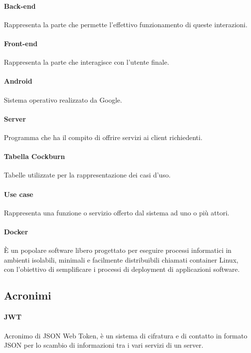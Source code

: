\paragraph{Back-end} Rappresenta la parte che permette l'effettivo funzionamento di queste interazioni.

\paragraph{Front-end} Rappresenta la parte che interagisce con l'utente finale.

\paragraph{Android} Sistema operativo realizzato da Google.

\paragraph{Server}  Programma che ha il compito di offrire servizi ai client richiedenti.

\paragraph{Tabella Cockburn} Tabelle utilizzate per la rappresentazione dei casi d'uso.

\paragraph{Use case} Rappresenta una funzione o servizio offerto dal sistema ad uno o più attori.

\paragraph{Docker} \`{E} un popolare software libero progettato per eseguire processi informatici in ambienti isolabili, minimali e facilmente distribuibili chiamati container Linux, con l'obiettivo di semplificare i processi di deployment di applicazioni software.
\newpage
\subsection{Acronimi}
\paragraph{JWT} Acronimo di JSON Web Token, è un sistema di cifratura e di contatto in formato JSON per lo scambio di informazioni tra i vari servizi di un server.

